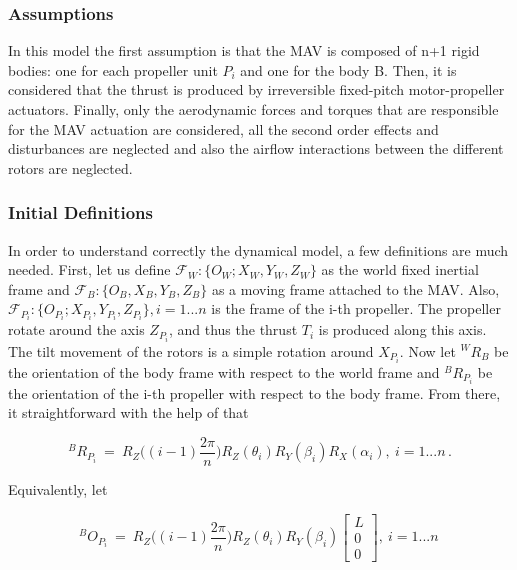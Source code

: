 \subsubsection{Assumptions}
\label{sec:assumptions}
In this model the first assumption is that the MAV is composed of n+1 rigid bodies:
one for each propeller unit $P_i$ and one for the body B. Then, it is considered that
the thrust is produced by irreversible fixed-pitch motor-propeller actuators. Finally,
only the aerodynamic forces and torques that are responsible for the MAV actuation
are considered, all the second order effects and disturbances are neglected and
also the airflow interactions between the different rotors are neglected.

\subsubsection{Initial Definitions}
\label{sec:definitions}
In order to understand correctly the dynamical model, a few definitions are much
needed. First, let us define $\mathcal{F}_{W} : \{O_{W}; X_{W},  Y_{W},  Z_{W}\}$
as the world fixed inertial frame and $\mathcal{F}_{B}: \{O_{B}, X_{B},  Y_{B},
Z_{B}\}$
as a moving frame attached to the MAV. Also, $\mathcal{F}_{P_{i}} : \{O_{P_{i}};
X_{P_{i}}, Y_{P_{i}},  Z_{P_{i}}\}, i = 1...n$ is the frame of the i-th propeller.
The propeller rotate around the axis $Z_{P_{i}}$, and thus the thrust $T_{i}$ is
produced along this axis. The tilt movement of the rotors is a simple rotation
around $X_{P_{i}}$. Now let $^{W}R_{B}$ be the orientation of the body frame
with respect to the world frame and $^{B}R_{P_{i}}$ be the orientation of the
i-th propeller with respect to the body frame. From there, it
straightforward with the help of  that

\begin{equation}
  \label{rot_b_pi}
  ^{B}R_{P_{i}} \ = \ R_{Z}\bigg((i-1)\frac{2\pi}{n}\bigg) R_Z(\theta_i)
  R_Y(\beta_i) R_{X}(\alpha_{i}),\  i = 1...n\, .
\end{equation}

Equivalently, let

\begin{equation}
  \label{O_pi}
  ^{B}O_{P_{i}} \ = \ R_{Z}\bigg((i-1)\frac{2\pi}{n}\bigg) R_Z(\theta_i) R_Y(\beta_i)
  \begin{bmatrix}
    L \\
    0 \\
    0
  \end{bmatrix}
  ,\   i = 1...n \,
\end{equation}

